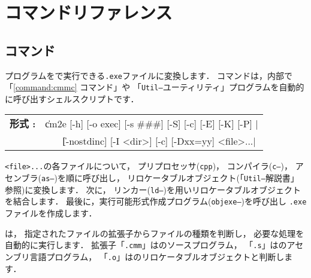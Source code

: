 % 
%
\chapter{コマンドリファレンス}
\label{app:command}


\section{{\cme}コマンド}

{\cmm}プログラムを{\tac}で実行できる{\tt .exe}ファイルに変換します．
{\cme}コマンドは，内部で「\ref{command:cmmc} {\cmmc}コマンド」や
「{\tt Util--}ユーティリティ」プログラムを自動的に呼び出すシェルスクリプトです．

\begin{flushleft}
\begin{tabular}{l l}
{\bf 形式 : } & \|cm2e [-h] [-o exec] [-s ###] [-S] [-c] [-E] [-K] [-P] | \\
              & ~~~ \| [-nostdinc] [-I <dir>] [-c] [-Dxx=yy] <file>...|
\end{tabular}
\end{flushleft}

{\tt <file>...}の各ファイルについて，
プリプロセッサ({\tt cpp})，
コンパイラ({\tt c--})，
アセンブラ({\tt as--})を順に呼び出し，
リロケータブルオブジェクト(「{\tt Util--}解説書」参照)に変換します．
次に，
リンカー({\tt ld--})を用いリロケータブルオブジェクトを結合します．
最後に，実行可能形式作成プログラム({\tt objexe--})を呼び出し
{\tt .exe}ファイルを作成します．

{\cme}は，
指定されたファイルの拡張子からファイルの種類を判断し，
必要な処理を自動的に実行します．
拡張子「{\tt .cmm}」は{\cmml}のソースプログラム，
「{\tt .s}」は{\tac}のアセンブリ言語プログラム，
「{\tt .o}」は{\tac}のリロケータブルオブジェクトと判断します．

